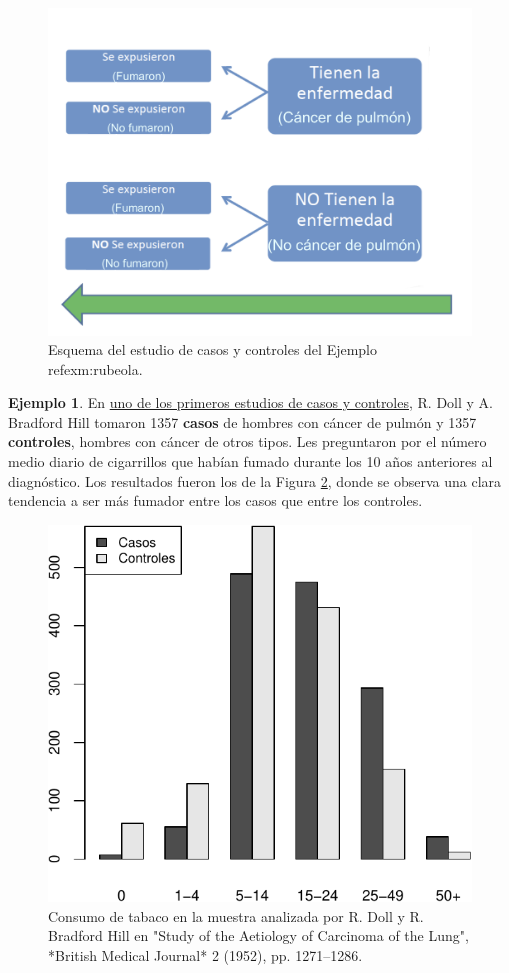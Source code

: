 \documentclass[
]{book}
\theoremstyle{definition}
\theoremstyle{definition}
\newtheorem{example}{Ejemplo}[chapter]
\theoremstyle{definition}
\theoremstyle{definition}
\theoremstyle{remark}
\begin{document}
\begin{figure}

{\centering \includegraphics[width=0.8\linewidth]{INREMDN_files/figure-html/cataratas} 

}

\caption{Esquema del estudio de casos y controles del Ejemplo \\ref{exm:rubeola}.}\label{fig:cataratas}
\end{figure}

\begin{example}
\protect\hypertarget{exm:unnamed-chunk-21}{}\label{exm:unnamed-chunk-21}En \href{https://www.ncbi.nlm.nih.gov/pmc/articles/PMC2022425/}{uno de los primeros estudios de casos y controles}, R. Doll y A. Bradford Hill tomaron 1357 \textbf{casos} de hombres con cáncer de pulmón y 1357 \textbf{controles}, hombres con cáncer de otros tipos. Les preguntaron por el número medio diario de cigarrillos que habían fumado durante los 10 años anteriores al diagnóstico. Los resultados fueron los de la Figura \ref{fig:doll}, donde se observa una clara tendencia a ser más fumador entre los casos que entre los controles.
\end{example}

\begin{figure}

{\centering \includegraphics[width=0.5\linewidth]{INREMDN_files/figure-latex/doll-1} 

}

\caption{Consumo de tabaco en la muestra analizada por R. Doll y R. Bradford Hill en "Study of the Aetiology of Carcinoma of the Lung", *British Medical Journal* 2 (1952), pp. 1271–1286.}\label{fig:doll}
\end{figure}
\end{document}
